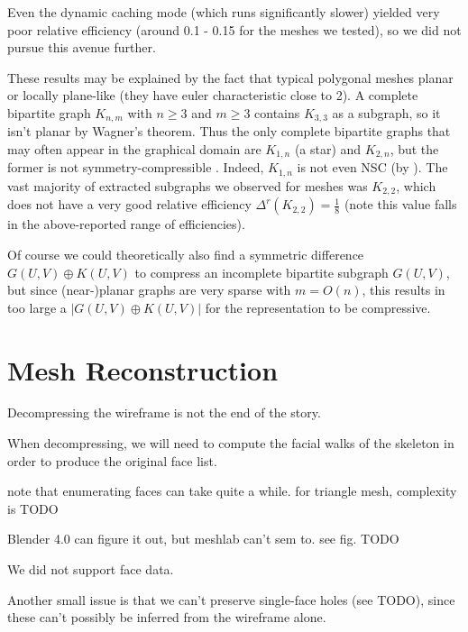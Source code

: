 \documentclass{egpubl}
\begin{document}
Even the dynamic caching mode (which runs significantly slower) yielded very poor relative efficiency (around 0.1 - 0.15 for the meshes we tested), so we did not pursue this avenue further.

These results may be explained by the fact that typical polygonal meshes planar or locally plane-like (they have euler characteristic close to 2). A complete bipartite graph $K_{n,m}$ with $n \geq 3$ and $m \geq 3$ contains $K_{3,3}$ as a subgraph, so it isn't planar by Wagner's theorem. Thus the only complete bipartite graphs that may often appear in the graphical domain are $K_{1,n}$ (a star) and $K_{2,n}$, but the former%
is not symmetry-compressible \cite[Theorem 2]{cibej2021automorphisms}. Indeed, $K_{1,n}$ is not even NSC (by \cite[Theorem 6]{cibej2021automorphisms}).
The vast majority of extracted subgraphs we observed for meshes was $K_{2,2}$, which does not have a very good relative efficiency $\Delta^r(K_{2,2}) = \frac{1}{8}$ (note this value falls in the above-reported range of efficiencies).

Of course we could theoretically also find a symmetric difference $G(U,V) \oplus K(U,V)$ to compress an incomplete bipartite subgraph $G(U,V)$, but since (near-)planar graphs are very sparse with $m = O(n)$, this results in too large a $|G(U,V) \oplus K(U,V)|$ for the representation to be compressive. %


\section{Mesh Reconstruction} \label{sec:reconstruction}

Decompressing the wireframe is not the end of the story.

When decompressing, we will need to compute the facial walks of the skeleton in order to produce the original face list.

note that enumerating faces can take quite a while. for triangle mesh, complexity is TODO %

Blender 4.0 can figure it out, but meshlab can't sem to. see fig. TODO

We did not support face data.

Another small issue is that we can't preserve single-face holes (see TODO), since these can't possibly be inferred from the wireframe alone.
\end{document}

